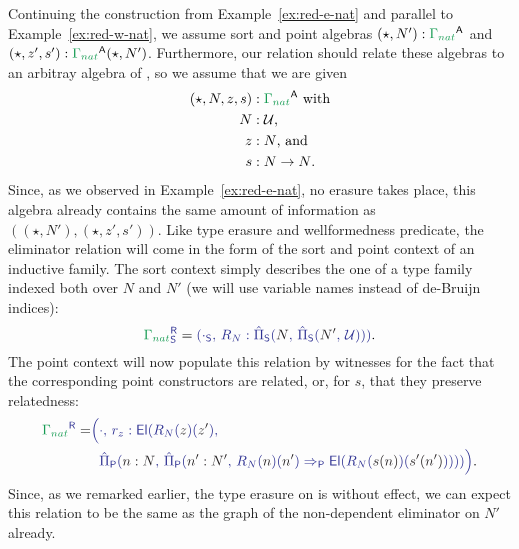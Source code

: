 \begin{example}
Continuing the construction from Example~\ref{ex:red-e-nat} and parallel to 
Example~\ref{ex:red-w-nat}, we assume sort and point algebras
$(\star,N') : \grm{\Gamma_{nat}}^\CC $ and $(\star,z',s') : \grm{\Gamma_{nat}}^\CC(\star, N')$.
Furthermore, our relation should relate these algebras to an arbitray algebra
of , so we assume that we are given
\begin{align*}
(\star, N, z, s) &: \grm{\Gamma_{nat}}^\CC \text{ with} \\ %
N &: \UU \text{,}\\
z &: N \text{, and} \\
s &: N \to N \text{.}
\end{align*}
Since, as we observed in Example~\ref{ex:red-e-nat}, no erasure takes place, this
algebra already contains the same amount of information as $((\star, N'), (\star, z', s'))$.
Like type erasure and wellformedness predicate, the eliminator relation will come
in the form of the sort and point context of an inductive family.
The sort context simply describes the one of a type family indexed both over $N$
and $N'$ (we will use variable names instead of de-Bruijn indices):
\begin{equation*}
\tqm{\grm{\Gamma_{nat}}^\RR_\Sc}
  = \tqm{(\cdot_\Sc ,\, R_N : \ExtPiS{N}{\ExtPiS{N'}{\UU}})} \text{.}
\end{equation*}
The point context will now populate this relation by witnesses for the fact
that the corresponding point constructors are related, or, for $s$, that they
preserve relatedness:
\begin{align*}
\tqm{\grm{\Gamma_{nat}}^\RR}
  =& \tqm{\Bigl(\cdot ,\, r_z : \El(R_N(\blm{z})(\blm{z'}) ,\, } \\
   & \tqm{ \phantom{\Bigl(}
    \ExtPiP{n : N}{\ExtPiP{n' : N'}{R_N(\blm{n})(\blm{n'}) \Rightarrow_\Pc
      \El(R_N(\blm{s(n)})(\blm{s'(n')}))}} \Bigr)} \text{.}
\end{align*}
Since, as we remarked earlier, the type erasure on  is without
effect, we can expect this relation to be the same as the graph of the
non-dependent eliminator on $N'$ already.
\end{example}

